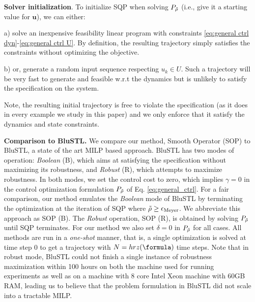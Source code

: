 \begin{exmp}
\textbf{Solver initialization}.
To initialize SQP when solving $P_{\tilde{\rho}}$ (i.e., give it a starting value for $\mathbf{u}$), we can either:

 a) solve an inexpensive feasibility linear program with constraints \eqref{eq:general ctrl dyn}-\eqref{eq:general ctrl U}. By definition, the resulting trajectory simply satisfies the constraints without optimizing the objective.
 
 b) or, generate a random input sequence respecting $u_k \in U$. 
 Such a trajectory will be very fast to generate and feasible w.r.t the dynamics but is unlikely to satisfy the specification on the system. 

Note, the resulting initial trajectory is free to violate the specification (as it does in every example we study in this paper) and we only enforce that it satisfy the dynamics and state constraints.


\textbf{Comparison to BluSTL.}
We compare our method, Smooth Operator (SOP) to BluSTL, a state of the art MILP based approach. BluSTL has two modes of operation:  \textit{Boolean} (B), which aims at satisfying the specification without maximizing its robustness, and \textit{Robust} (R), which attempts to maximize robustness. 
In both modes, we set the control cost to zero, which implies $\gamma=0$ in the control optimization formulation $P_{\tilde{\rho}}$ of Eq. \ref{eq:general_ctrl}. For a fair comparison, our method emulates the \textit{Boolean} mode of BluSTL by terminating the optimization at the iteration of SQP where $\tilde{\rho} \geq \epsilon_{\text{Meyer}}$. We abbreviate this approach as SOP (B).
The \textit{Robust} operation, SOP (R), is obtained by solving $P_{\tilde{\rho}}$ until SQP terminates. For our method we also set $\delta=0$ in $P_{\tilde{\rho}}$ for all cases.
All methods are run in a \textit{one-shot} manner, that is, a single optimization is solved at time step $0$ to get a trajectory with $N = hrz(\formula)$ time steps. Note that in robust mode, BluSTL could not finish a single instance of robustness maximization within 100 hours on both the machine used for running experiments as well as on a machine with 8 core Intel Xeon machine with 60GB RAM, leading us to believe that the problem formulation in BluSTL did not scale into a tractable MILP. 



\end{exmp}

